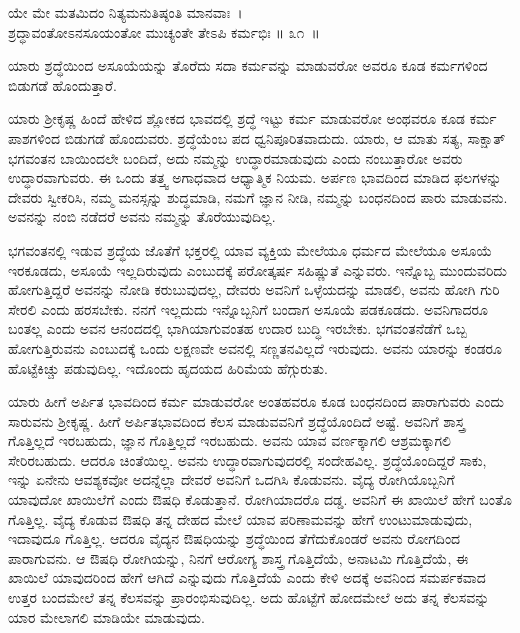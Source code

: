 \begin{shloka}
ಯೇ ಮೇ ಮತಮಿದಂ ನಿತ್ಯಮನುತಿಷ್ಠಂತಿ ಮಾನವಾಃ~।\\ಶ್ರದ್ಧಾವಂತೋಽನಸೂಯಂತೋ ಮುಚ್ಯಂತೇ ತೇಽಪಿ ಕರ್ಮಭಿಃ \hfill॥ ೩೧~॥
\end{shloka}

\begin{artha}
ಯಾರು ಶ್ರದ್ಧೆಯಿಂದ ಅಸೂಯೆಯನ್ನು ತೊರೆದು ಸದಾ ಕರ್ಮವನ್ನು ಮಾಡುವರೋ ಅವರೂ ಕೂಡ ಕರ್ಮಗಳಿಂದ ಬಿಡುಗಡೆ ಹೊಂದುತ್ತಾರೆ.
\end{artha}

ಯಾರು ಶ‍್ರೀಕೃಷ್ಣ ಹಿಂದೆ ಹೇಳಿದ ಶ್ಲೋಕದ ಭಾವದಲ್ಲಿ ಶ್ರದ್ಧೆ ಇಟ್ಟು ಕರ್ಮ ಮಾಡುವರೋ ಅಂಥವರೂ ಕೂಡ ಕರ್ಮ ಪಾಶಗಳಿಂದ ಬಿಡುಗಡೆ ಹೊಂದುವರು. ಶ್ರದ್ಧೆಯೆಂಬ ಪದ ಧ್ವನಿಪೂರಿತವಾದುದು. ಯಾರು, ಆ ಮಾತು ಸತ್ಯ, ಸಾಕ್ಷಾತ್ ಭಗವಂತನ ಬಾಯಿಂದಲೇ ಬಂದಿದೆ, ಅದು ನಮ್ಮನ್ನು ಉದ್ಧಾರಮಾಡುವುದು ಎಂದು ನಂಬುತ್ತಾರೋ ಅವರು ಉದ್ಧಾರವಾಗುವರು. ಈ ಒಂದು ತತ್ತ್ವ ಅಗಾಧವಾದ ಆಧ್ಯಾತ್ಮಿಕ ನಿಯಮ. ಅರ್ಪಣ ಭಾವದಿಂದ ಮಾಡಿದ ಫಲಗಳನ್ನು ದೇವರು ಸ್ವೀಕರಿಸಿ, ನಮ್ಮ ಮನಸ್ಸನ್ನು ಶುದ್ಧಮಾಡಿ, ನಮಗೆ ಜ್ಞಾನ ನೀಡಿ, ನಮ್ಮನ್ನು ಬಂಧನದಿಂದ ಪಾರು ಮಾಡುವನು. ಅವನನ್ನು ನಂಬಿ ನಡೆದರೆ ಅವನು ನಮ್ಮನ್ನು ತೊರೆಯುವುದಿಲ್ಲ.

ಭಗವಂತನಲ್ಲಿ ಇಡುವ ಶ್ರದ್ಧೆಯ ಜೊತೆಗೆ ಭಕ್ತರಲ್ಲಿ ಯಾವ ವ್ಯಕ್ತಿಯ ಮೇಲೆಯೂ ಧರ್ಮದ ಮೇಲೆಯೂ ಅಸೂಯೆ ಇರಕೂಡದು, ಅಸೂಯೆ ಇಲ್ಲದಿರುವುದು ಎಂಬುದಕ್ಕೆ ಪರೋತ್ಕರ್ಷ ಸಹಿಷ್ಣುತೆ ಎನ್ನುವರು. ಇನ್ನೊಬ್ಬ ಮುಂದುವರಿದು ಹೋಗುತ್ತಿದ್ದರೆ ಅವನನ್ನು ನೋಡಿ ಕರುಬುವು\-ದಲ್ಲ, ದೇವರು ಅವನಿಗೆ ಒಳ್ಳೆಯದನ್ನು ಮಾಡಲಿ, ಅವನು ಹೋಗಿ ಗುರಿ ಸೇರಲಿ ಎಂದು ಹರಸಬೇಕು. ನನಗೆ ಇಲ್ಲದುದು ಇನ್ನೊಬ್ಬನಿಗೆ ಬಂದಾಗ ಅಸೂಯೆ ಪಡಕೂಡದು. ಅವನಿಗಾದರೂ ಬಂತಲ್ಲ ಎಂದು ಅವನ ಆನಂದದಲ್ಲಿ ಭಾಗಿಯಾಗುವಂತಹ ಉದಾರ ಬುದ್ಧಿ ಇರಬೇಕು. ಭಗವಂತ\-ನೆಡೆಗೆ ಒಬ್ಬ ಹೋಗುತ್ತಿರುವನು ಎಂಬುದಕ್ಕೆ ಒಂದು ಲಕ್ಷಣವೇ ಅವನಲ್ಲಿ ಸಣ್ಣತನವಿಲ್ಲದೆ ಇರುವುದು. ಅವನು ಯಾರನ್ನು ಕಂಡರೂ ಹೊಟ್ಟೆಕಿಚ್ಚು ಪಡುವುದಿಲ್ಲ. ಇದೊಂದು ಹೃದಯದ ಹಿರಿಮೆಯ ಹೆಗ್ಗುರುತು.

ಯಾರು ಹೀಗೆ ಅರ್ಪಿತ ಭಾವದಿಂದ ಕರ್ಮ ಮಾಡುವರೋ ಅಂತಹವರೂ ಕೂಡ ಬಂಧನದಿಂದ ಪಾರಾಗುವರು ಎಂದು ಸಾರುವನು ಶ‍್ರೀಕೃಷ್ಣ. ಹೀಗೆ ಅರ್ಪಿತಭಾವದಿಂದ ಕೆಲಸ ಮಾಡುವವನಿಗೆ ಶ್ರದ್ಧೆಯೊಂದಿದೆ ಅಷ್ಟೆ. ಅವನಿಗೆ ಶಾಸ್ತ್ರ ಗೊತ್ತಿಲ್ಲದೆ ಇರಬಹುದು, ಜ್ಞಾನ ಗೊತ್ತಿಲ್ಲದೆ ಇರಬಹುದು. ಅವನು ಯಾವ ವರ್ಣಕ್ಕಾಗಲಿ ಆಶ್ರಮಕ್ಕಾಗಲಿ ಸೇರಿರಬಹುದು. ಆದರೂ ಚಿಂತೆಯಿಲ್ಲ. ಅವನು ಉದ್ಧಾರವಾಗುವುದರಲ್ಲಿ ಸಂದೇಹವಿಲ್ಲ. ಶ್ರದ್ಧೆಯೊಂದಿದ್ದರೆ ಸಾಕು, ಇನ್ನು ಏನೇನು ಆವಶ್ಯಕವೋ ಅದನ್ನೆಲ್ಲಾ ದೇವರೆ ಅವನಿಗೆ ಒದಗಿಸಿ ಕೊಡುವನು. ವೈದ್ಯ ರೋಗಿಯೊಬ್ಬನಿಗೆ ಯಾವುದೋ ಖಾಯಿಲೆಗೆ ಎಂದು ಔಷಧಿ ಕೊಡುತ್ತಾನೆ. ರೋಗಿಯಾದರೊ ದಡ್ಡ. ಅವನಿಗೆ ಈ ಖಾಯಿಲೆ ಹೇಗೆ ಬಂತೊ ಗೊತ್ತಿಲ್ಲ. ವೈದ್ಯ ಕೊಡುವ ಔಷಧಿ ತನ್ನ ದೇಹದ ಮೇಲೆ ಯಾವ ಪರಿಣಾಮವನ್ನು ಹೇಗೆ ಉಂಟುಮಾಡುವುದು, ಇದಾವುದೂ ಗೊತ್ತಿಲ್ಲ. ಆದರೂ ವೈದ್ಯನ ಔಷಧಿಯನ್ನು ಶ್ರದ್ಧೆಯಿಂದ ತೆಗೆದುಕೊಂಡರೆ ಅವನು ರೋಗದಿಂದ ಪಾರಾಗುವನು. ಆ ಔಷಧಿ ರೋಗಿಯನ್ನು, ನಿನಗೆ ಆರೋಗ್ಯ ಶಾಸ್ತ್ರ ಗೊತ್ತಿದೆಯೆ, ಅನಾಟಮಿ ಗೊತ್ತಿದೆಯೆ, ಈ ಖಾಯಿಲೆ ಯಾವುದರಿಂದ ಹೇಗೆ ಆಗಿದೆ ಎನ್ನುವುದು ಗೊತ್ತಿದೆಯೆ ಎಂದು ಕೇಳಿ ಅದಕ್ಕೆ ಅವನಿಂದ ಸಮರ್ಪಕವಾದ ಉತ್ತರ ಬಂದಮೇಲೆ ತನ್ನ ಕೆಲಸವನ್ನು ಪ್ರಾರಂಭಿಸುವುದಿಲ್ಲ. ಅದು ಹೊಟ್ಟೆಗೆ ಹೋದಮೇಲೆ ಅದು ತನ್ನ ಕೆಲಸವನ್ನು ಯಾರ ಮೇಲಾಗಲಿ ಮಾಡಿಯೇ ಮಾಡುವುದು.

